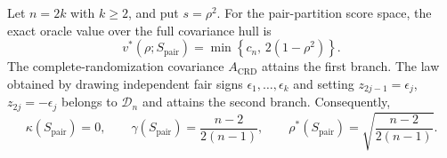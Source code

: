 Let \(n=2k\) with \(k\geq2\), and put \(s=\rho^2\).  For the pair-partition score space, the exact oracle value over the full covariance hull is
\[
v^*(\rho;S_{\mathrm{pair}})
=\min\left\{c_n,\,2(1-\rho^2)\right\}.
\]
The complete-randomization covariance \(A_{\mathrm{CRD}}\) attains the first branch.  The law obtained by drawing independent fair signs \(\epsilon_1,\ldots,\epsilon_k\) and setting \(z_{2j-1}=\epsilon_j\), \(z_{2j}=-\epsilon_j\) belongs to \(\mathcal D_n\) and attains the second branch.  Consequently,
\[
\kappa(S_{\mathrm{pair}})=0,
\qquad
\gamma(S_{\mathrm{pair}})=\frac{n-2}{2(n-1)},
\qquad
\rho^*(S_{\mathrm{pair}})=\sqrt{\frac{n-2}{2(n-1)}}.
\]